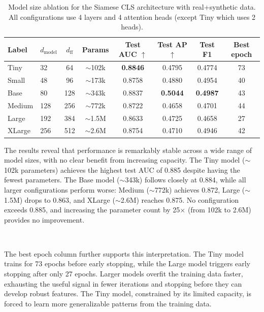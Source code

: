 \begin{table}[H]
\centering
\begin{tabular}{llcccccc}
\toprule
\textbf{Label} & \textbf{$d_{\text{model}}$} & \textbf{$d_{\text{ff}}$} & \textbf{Params} & \textbf{Test AUC $\uparrow$} & \textbf{Test AP $\uparrow$} & \textbf{Test F1} & \textbf{Best epoch} \\
\midrule
Tiny   & 32  & 64  & $\sim$102k  & \textbf{0.8846} & 0.4795 & 0.4774 & 73 \\
Small  & 48  & 96  & $\sim$173k  & 0.8758 & 0.4880 & 0.4954 & 40 \\
Base   & 80  & 128 & $\sim$343k  & 0.8837 & \textbf{0.5044} & \textbf{0.4987} & 43 \\
Medium & 128 & 256 & $\sim$772k  & 0.8722 & 0.4658 & 0.4701 & 44 \\
Large  & 192 & 384 & $\sim$1.5M  & 0.8633 & 0.4725 & 0.4658 & 27 \\
XLarge & 256 & 512 & $\sim$2.6M  & 0.8754 & 0.4710 & 0.4946 & 42 \\
\bottomrule
\end{tabular}
\caption{Model size ablation for the Siamese CLS architecture with real+synthetic data. All configurations use 4 layers and 4 attention heads (except Tiny which uses 2 heads).}
\label{tab:size_ablation}
\end{table}

The results reveal that performance is remarkably stable across a wide range of model sizes, with no clear benefit from increasing capacity. The Tiny model ($\sim$102k parameters) achieves the highest test AUC of 0.885 despite having the fewest parameters. The Base model ($\sim$343k) follows closely at 0.884, while all larger configurations perform worse: Medium ($\sim$772k) achieves 0.872, Large ($\sim$1.5M) drops to 0.863, and XLarge ($\sim$2.6M) reaches 0.875. No configuration exceeds 0.885, and increasing the parameter count by 25$\times$ (from 102k to 2.6M) provides no improvement.

\

The best epoch column further supports this interpretation. The Tiny model trains for 73 epochs before early stopping, while the Large model triggers early stopping after only 27 epochs. Larger models overfit the training data faster, exhausting the useful signal in fewer iterations and stopping before they can develop robust features. The Tiny model, constrained by its limited capacity, is forced to learn more generalizable patterns from the training data.

